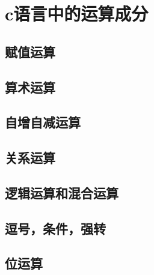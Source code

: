 \documentclass[UTF8]{article}
\begin{document}
\section{c语言中的运算成分}
\subsection{赋值运算}
\subsection{算术运算}
\subsection{自增自减运算}
\subsection{关系运算}
\subsection{逻辑运算和混合运算}
\subsection{逗号，条件，强转}
\subsection{位运算}
\end{document}
